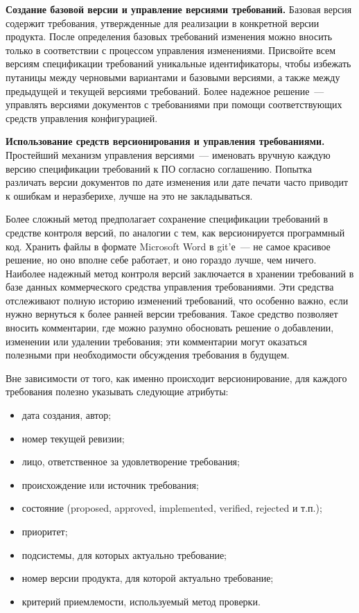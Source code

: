 \documentclass{../../text-style}
\begin{document}
\textbf{Создание базовой версии и управление версиями требований.}
Базовая версия содержит требования, утвержденные для реализации в конкретной версии продукта.
После определения базовых требований изменения можно вносить только в соответствии с процессом управления изменениями.
Присвойте всем версиям спецификации требований уникальные идентификаторы, чтобы избежать путаницы между черновыми вариантами и базовыми версиями, а также между предыдущей и текущей версиями требований.
Более надежное решение~--- управлять версиями документов с требованиями при помощи соответствующих средств управления конфигурацией.

\textbf{Использование средств версионирования и управления требованиями.}
Простейший механизм управления версиями~--- именовать вручную каждую версию спецификации требований к ПО согласно соглашению.
Попытка различать версии документов по дате изменения или дате печати часто приводит к ошибкам и неразберихе, лучше на это не закладываться.

Более сложный метод предполагает сохранение спецификации требований в средстве контроля версий, по аналогии с тем, как версионируется программный код.
Хранить файлы в формате Microsoft Word в git’е~--- не самое красивое решение, но оно вполне себе работает, и оно гораздо лучше, чем ничего.
Наиболее надежный метод контроля версий заключается в хранении требований в базе данных коммерческого средства управления требованиями.
Эти средства отслеживают полную историю изменений требований, что особенно важно, если нужно вернуться к более ранней версии требования.
Такое средство позволяет вносить комментарии, где можно разумно обосновать решение о добавлении, изменении или удалении требования; эти комментарии могут оказаться полезными при необходимости обсуждения требования в будущем.

Вне зависимости от того, как именно происходит версионирование, для каждого требования полезно указывать следующие атрибуты:
\begin{itemize}
    \item дата создания, автор;
    \item номер текущей ревизии;
    \item лицо, ответственное за удовлетворение требования;
    \item происхождение или источник требования;
    \item состояние (proposed, approved, implemented, verified, rejected и т.п.);
    \item приоритет;
    \item подсистемы, для которых актуально требование;
    \item номер версии продукта, для которой актуально требование;
    \item критерий приемлемости, используемый метод проверки.
\end{itemize}
\end{document}
